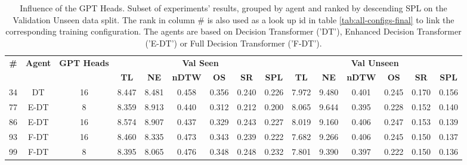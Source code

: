 \begin{table}
\centering
\caption{\label{tab:heads}Influence of the GPT Heads. Subset of experiments' results, grouped by agent and ranked by descending SPL on the Validation Unseen data split. The rank in column \# is also used as a look up id in table \ref{tab:all-configs-final} to link the corresponding training configuration.     \newline The agents are based on Decision Transformer ('DT'), Enhanced Decision Transformer ('E-DT') or Full Decision Transformer ('F-DT').}
\begin{tabular}{@{\hskip3pt}c@{\hskip3pt}c@{\hskip3pt}c@{\hskip3pt}c@{\hskip3pt}c@{\hskip3pt}c@{\hskip3pt}c@{\hskip3pt}c@{\hskip3pt}c@{\hskip3pt}c@{\hskip3pt}c@{\hskip3pt}c@{\hskip3pt}c@{\hskip3pt}c@{\hskip3pt}c}
\toprule
\textbf{\#} & \textbf{Agent} & \textbf{GPT Heads} & \multicolumn{6}{c}{\textbf{Val Seen}} & \multicolumn{6}{c}{\textbf{Val Unseen}} \\
\cmidrule(l){4-9} \cmidrule(l){10-15} \textbf{~} &     \textbf{~} &         \textbf{~} &       \textbf{TL} & \textbf{NE} & \textbf{nDTW} & \textbf{OS} & \textbf{SR} & \textbf{SPL} &         \textbf{TL} & \textbf{NE} & \textbf{nDTW} & \textbf{OS} & \textbf{SR} & \textbf{SPL} \\
\midrule
         34 &             DT &                 16 &             8.447 &       8.481 &         0.458 &       0.356 &       0.240 &        0.226 &               7.972 &       9.480 &         0.401 &       0.245 &       0.170 &        0.156 \\
         77 &           E-DT &                  8 &             8.359 &       8.913 &         0.440 &       0.312 &       0.212 &        0.200 &               8.065 &       9.644 &         0.395 &       0.228 &       0.152 &        0.140 \\
         86 &           E-DT &                 16 &             8.574 &       8.907 &         0.437 &       0.329 &       0.243 &        0.227 &               8.019 &       9.160 &         0.406 &       0.247 &       0.153 &        0.139 \\
         93 &           F-DT &                 16 &             8.460 &       8.335 &         0.473 &       0.343 &       0.239 &        0.222 &               7.682 &       9.266 &         0.406 &       0.245 &       0.150 &        0.137 \\
         99 &           F-DT &                  8 &             8.395 &       8.065 &         0.476 &       0.348 &       0.248 &        0.232 &               7.801 &       9.390 &         0.397 &       0.222 &       0.150 &        0.136 \\
\bottomrule
\end{tabular}
\end{table}
